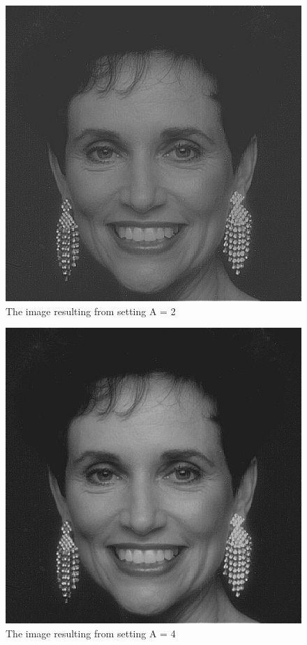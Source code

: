 \documentclass[12pt,letterpaper]{article}
\begin{document}
\clearpage 
\newpage

\begin{figure}[ht]
\centering
\includegraphics[scale=0.135]{woman/ker_a2}
\caption{\small{The image resulting from setting A = 2}
\label{fig:ker_a2} }
\end{figure}
\begin{figure}[ht]
\centering
\includegraphics[scale=0.135]{woman/ker_a4}
\caption{\small{The image resulting from setting A = 4}
\label{fig:ker_a4} }
\end{figure}
\clearpage 
\newpage
\end{document}
